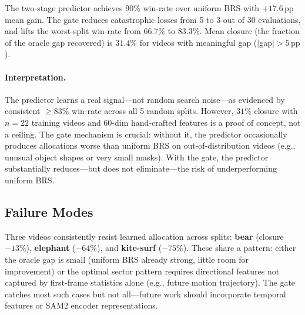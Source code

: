 The two-stage predictor achieves $90\%$ win-rate over uniform BRS with $+17.6\,\mathrm{pp}$ mean gain.
The gate reduces catastrophic losses from 5 to 3 out of 30 evaluations, and lifts the worst-split win-rate from $66.7\%$ to $83.3\%$.
Mean closure (the fraction of the oracle gap recovered) is $31.4\%$ for videos with meaningful gap ($|$gap$|{>}5\,\mathrm{pp}$).

\paragraph{Interpretation.}
The predictor learns a real signal---not random search noise---as evidenced by consistent ${\geq}83\%$ win-rate across all 5 random splits.
However, $31\%$ closure with $n{=}22$ training videos and 60-dim hand-crafted features is a proof of concept, not a ceiling.
The gate mechanism is crucial: without it, the predictor occasionally produces allocations worse than uniform BRS on out-of-distribution videos (e.g., unusual object shapes or very small masks).
With the gate, the predictor substantially reduces---but does not eliminate---the risk of underperforming uniform BRS.

\subsection{Failure Modes}

Three videos consistently resist learned allocation across splits:
\textbf{bear} (closure $-13\%$), \textbf{elephant} ($-64\%$), and \textbf{kite-surf} ($-75\%$).
These share a pattern: either the oracle gap is small (uniform BRS already strong, little room for improvement) or the optimal sector pattern requires directional features not captured by first-frame statistics alone (e.g., future motion trajectory).
The gate catches most such cases but not all---future work should incorporate temporal features or SAM2 encoder representations.
